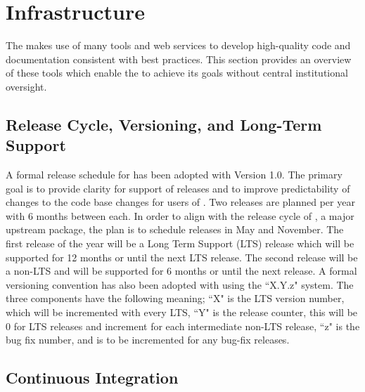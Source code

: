 \section{Infrastructure}
\label{sec:infrastructure}

The \sunpyproj makes use of many tools and web services to develop high-quality code and documentation consistent with best practices.
This section provides an overview of these tools which enable the \sunpyproj to achieve its goals without central institutional oversight.

\subsection{Release Cycle, Versioning, and Long-Term Support}
\label{sec:release}

A formal release schedule for \sunpypkg has been adopted with Version 1.0.
The primary goal is to provide clarity for support of releases and to improve predictability of changes to the code base changes for users of \sunpypkg.
Two releases are planned per year with 6 months between each.
In order to align with the release cycle of \astropypkg, a major upstream package, the plan is to schedule releases in May and November.
The first release of the year will be a Long Term Support (LTS) release which will be supported for 12 months or until the next LTS release.
The second release will be a non-LTS and will be supported for 6 months or until the next release.
A formal versioning convention has also been adopted with \sunpypkg using the ``X.Y.z" system. The three components have the following meaning;
``X" is the LTS version number, which will be incremented with every LTS,
``Y" is the release counter, this will be 0 for LTS releases and increment for each intermediate non-LTS release,
``z" is the bug fix number, and is to be incremented for any bug-fix releases.



\subsection{Continuous Integration}
\label{sec:continuous-integration}

